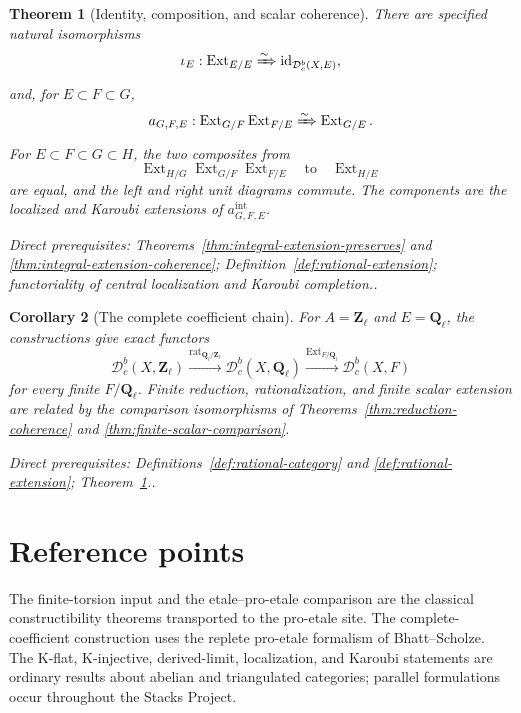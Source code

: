\documentclass[10pt]{article}
\newtheorem{theorem}{Theorem}[section]
\newtheorem{corollary}[theorem]{Corollary}
\theoremstyle{definition}
\newcommand{\Zl}{\mathbf Z_\ell}
\newcommand{\Ql}{\mathbf Q_\ell}
\newcommand{\Dbc}{\mathcal D^b_c}
\newcommand{\depends}[1]{\par\smallskip\noindent\textit{Direct prerequisites:} #1.}
\begin{document}
\begin{theorem}[Identity, composition, and scalar coherence]
\label{thm:extension-coherence}
There are specified natural isomorphisms
\[
 \iota_E:\operatorname{Ext}_{E/E}\xRightarrow{\sim}
     \operatorname{id}_{\Dbc(X,E)},
\]
and, for $E\subset F\subset G$,
\[
 a_{G,F,E}:
 \operatorname{Ext}_{G/F}\operatorname{Ext}_{F/E}
 \xRightarrow{\sim}\operatorname{Ext}_{G/E}.
\]
For $E\subset F\subset G\subset H$, the two composites from
\[
 \operatorname{Ext}_{H/G}\operatorname{Ext}_{G/F}
       \operatorname{Ext}_{F/E}
 \quad\text{to}\quad\operatorname{Ext}_{H/E}
\]
are equal, and the left and right unit diagrams commute.  The components
are the localized and Karoubi extensions of
$a^{\mathrm{int}}_{G,F,E}$.
\depends{Theorems~\ref{thm:integral-extension-preserves} and
\ref{thm:integral-extension-coherence};
Definition~\ref{def:rational-extension}; functoriality of central
localization and Karoubi completion.}
\end{theorem}

\begin{corollary}[The complete coefficient chain]
For $A=\Zl$ and $E=\Ql$, the constructions give exact functors
\[
 \Dbc(X,\Zl)
 \xrightarrow{\operatorname{rat}_{\Ql/\Zl}}
 \Dbc(X,\Ql)
 \xrightarrow{\operatorname{Ext}_{F/\Ql}}
 \Dbc(X,F)
\]
for every finite $F/\Ql$.  Finite reduction, rationalization, and finite
scalar extension are related by the comparison isomorphisms of
Theorems~\ref{thm:reduction-coherence} and
\ref{thm:finite-scalar-comparison}.
\depends{Definitions~\ref{def:rational-category} and
\ref{def:rational-extension}; Theorem~\ref{thm:extension-coherence}.}
\end{corollary}

\section{Reference points}

The finite-torsion input and the etale--pro-etale comparison are the
classical constructibility theorems transported to the pro-etale site.  The
complete-coefficient construction uses the replete pro-etale formalism of
Bhatt--Scholze.  The K-flat, K-injective, derived-limit, localization, and
Karoubi statements are ordinary results about abelian and triangulated
categories; parallel formulations occur throughout the Stacks Project.
\end{document}
